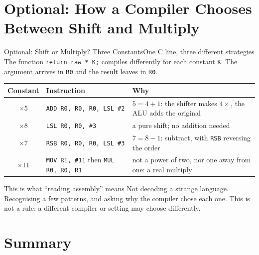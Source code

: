 \documentclass[9pt,aspectratio=169,xcolor=table]{beamer}
\begin{document}
\section{Optional: How a Compiler Chooses Between Shift and Multiply}

\begin{frame}{Optional: Shift or Multiply? Three Constants}{One C line, three different strategies}
    \leavevmode
    {\small The function \texttt{return raw * K;} compiles differently for each constant \texttt{K}. The argument arrives in \texttt{R0} and the result leaves in \texttt{R0}.}

    \vspace{2mm}
    \begin{center}
    {\small
    \striped
    \begin{tabular}{@{}c l R{.34\textwidth}@{}}
        \toprule
        \textbf{Constant} & \textbf{Instruction} & \textbf{Why} \\
        \midrule
        $\times 5$  & \texttt{ADD R0, R0, R0, LSL \#2} & $5 = 4 + 1$: the shifter makes $4\times$, the ALU adds the original \\
        $\times 8$  & \texttt{LSL R0, R0, \#3}         & a pure shift; no addition needed \\
        $\times 7$  & \texttt{RSB R0, R0, R0, LSL \#3} & $7 = 8 - 1$: subtract, with \texttt{RSB} reversing the order \\
        $\times 11$ & \texttt{MOV R1, \#11} then \texttt{MUL R0, R0, R1} & not a power of two, nor one away from one: a real multiply \\
        \bottomrule
    \end{tabular}}
    \end{center}

    \vspace{2mm}
    \begin{block}{This is what ``reading assembly'' means}
        Not decoding a strange language. Recognising a few patterns, and asking \alert{why the compiler chose each one}. This is not a rule: a different compiler or setting may choose differently.
    \end{block}
\end{frame}


\section{Summary}
\end{document}
